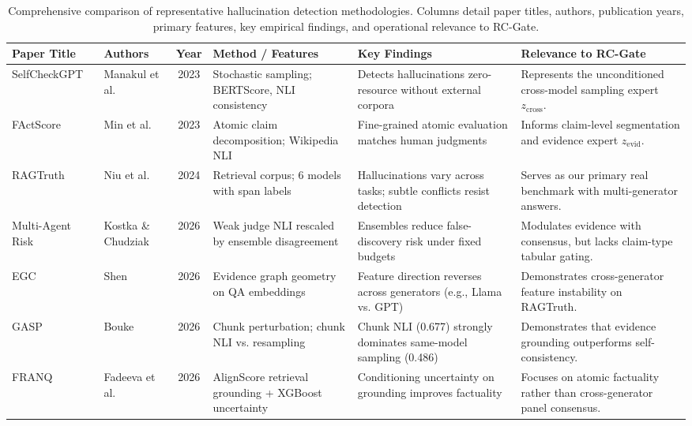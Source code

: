 \documentclass[pdflatex,sn-mathphys,Numbered]{sn-jnl}
\begin{document}
\begin{table}[htbp]
\caption{Comprehensive comparison of representative hallucination detection methodologies. Columns detail paper titles, authors, publication years, primary features, key empirical findings, and operational relevance to RC-Gate.}\label{tab:related_work}
\scriptsize
\setlength{\tabcolsep}{3pt}
\begin{tabular}{@{}p{2.2cm}p{1.6cm}cp{2.2cm}p{2.6cm}p{2.8cm}@{}}
\toprule
\textbf{Paper Title} & \textbf{Authors} & \textbf{Year} & \textbf{Method / Features} & \textbf{Key Findings} & \textbf{Relevance to RC-Gate} \\
\midrule
SelfCheckGPT~\cite{manakul2023selfcheckgpt} & Manakul et al. & 2023 & Stochastic sampling; BERTScore, NLI consistency & Detects hallucinations zero-resource without external corpora & Represents the unconditioned cross-model sampling expert $z_{\mathrm{cross}}$. \\
\addlinespace
FActScore~\cite{min2023factscore} & Min et al. & 2023 & Atomic claim decomposition; Wikipedia NLI & Fine-grained atomic evaluation matches human judgments & Informs claim-level segmentation and evidence expert $z_{\mathrm{evid}}$. \\
\addlinespace
RAGTruth~\cite{niu2024ragtruth} & Niu et al. & 2024 & Retrieval corpus; 6 models with span labels & Hallucinations vary across tasks; subtle conflicts resist detection & Serves as our primary real benchmark with multi-generator answers. \\
\addlinespace
Multi-Agent Risk~\cite{kostka2026uncertainty} & Kostka \& Chudziak & 2026 & Weak judge NLI rescaled by ensemble disagreement & Ensembles reduce false-discovery risk under fixed budgets & Modulates evidence with consensus, but lacks claim-type tabular gating. \\
\addlinespace
EGC~\cite{shen2026egc} & Shen & 2026 & Evidence graph geometry on QA embeddings & Feature direction reverses across generators (e.g., Llama vs. GPT) & Demonstrates cross-generator feature instability on RAGTruth. \\
\addlinespace
GASP~\cite{bouke2026gasp} & Bouke & 2026 & Chunk perturbation; chunk NLI vs. resampling & Chunk NLI (0.677) strongly dominates same-model sampling (0.486) & Demonstrates that evidence grounding outperforms self-consistency. \\
\addlinespace
FRANQ~\cite{fadeeva2026franq} & Fadeeva et al. & 2026 & AlignScore retrieval grounding + XGBoost uncertainty & Conditioning uncertainty on grounding improves factuality & Focuses on atomic factuality rather than cross-generator panel consensus. \\

\end{tabular}
\end{table}
\end{document}
